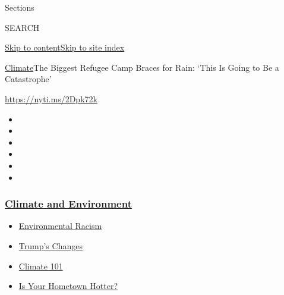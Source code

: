 Sections

SEARCH

\protect\hyperlink{site-content}{Skip to
content}\protect\hyperlink{site-index}{Skip to site index}

\href{/section/climate}{Climate}\textbar{}The Biggest Refugee Camp
Braces for Rain: `This Is Going to Be a Catastrophe'

\url{https://nyti.ms/2Dpk72k}

\begin{itemize}
\item
\item
\item
\item
\item
\item
\end{itemize}

\hypertarget{climate-and-environment}{%
\subsubsection{\texorpdfstring{\href{https://www.nytimes3xbfgragh.onion/section/climate?name=styln-climate\&region=TOP_BANNER\&block=storyline_menu_recirc\&action=click\&pgtype=Article\&impression_id=dd6269a0-f2b8-11ea-b60c-6f967e7f947d\&variant=undefined}{Climate
and
Environment}}{Climate and Environment}}\label{climate-and-environment}}

\begin{itemize}
\tightlist
\item
  \href{https://www.nytimes3xbfgragh.onion/interactive/2020/08/24/climate/racism-redlining-cities-global-warming.html?name=styln-climate\&region=TOP_BANNER\&block=storyline_menu_recirc\&action=click\&pgtype=Article\&impression_id=dd6290b0-f2b8-11ea-b60c-6f967e7f947d\&variant=undefined}{Environmental
  Racism}
\item
  \href{https://www.nytimes3xbfgragh.onion/interactive/2020/climate/trump-environment-rollbacks.html?name=styln-climate\&region=TOP_BANNER\&block=storyline_menu_recirc\&action=click\&pgtype=Article\&impression_id=dd6290b1-f2b8-11ea-b60c-6f967e7f947d\&variant=undefined}{Trump's
  Changes}
\item
  \href{https://www.nytimes3xbfgragh.onion/interactive/2020/04/19/climate/climate-crash-course-1.html?name=styln-climate\&region=TOP_BANNER\&block=storyline_menu_recirc\&action=click\&pgtype=Article\&impression_id=dd6290b2-f2b8-11ea-b60c-6f967e7f947d\&variant=undefined}{Climate
  101}
\item
  \href{https://www.nytimes3xbfgragh.onion/interactive/2018/08/30/climate/how-much-hotter-is-your-hometown.html?name=styln-climate\&region=TOP_BANNER\&block=storyline_menu_recirc\&action=click\&pgtype=Article\&impression_id=dd6290b3-f2b8-11ea-b60c-6f967e7f947d\&variant=undefined}{Is
  Your Hometown Hotter?}
\end{itemize}

